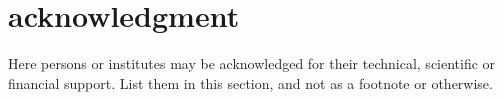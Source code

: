 \documentclass[11pt,onecolumn,notitlepage]{article}
\begin{document}








\section*{acknowledgment} 

Here persons or institutes may be acknowledged for their technical, scientific or financial support. List them in this section, and not as a footnote or otherwise.

\nocite{*}


\end{document}
